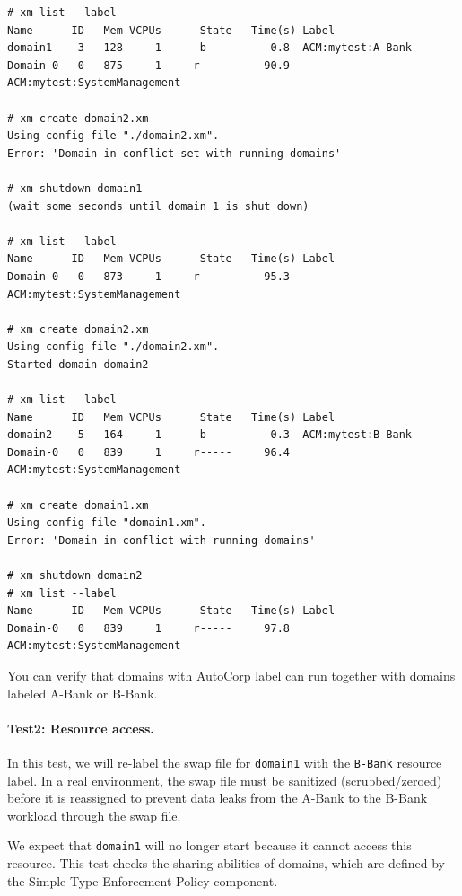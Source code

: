 \documentclass[11pt,twoside,final,openright]{report}
\begin{document}
\begin{scriptsize}
\begin{verbatim}
# xm list --label
Name      ID   Mem VCPUs      State   Time(s) Label
domain1    3   128     1     -b----      0.8  ACM:mytest:A-Bank
Domain-0   0   875     1     r-----     90.9  ACM:mytest:SystemManagement

# xm create domain2.xm
Using config file "./domain2.xm".
Error: 'Domain in conflict set with running domains'

# xm shutdown domain1
(wait some seconds until domain 1 is shut down)

# xm list --label
Name      ID   Mem VCPUs      State   Time(s) Label
Domain-0   0   873     1     r-----     95.3  ACM:mytest:SystemManagement

# xm create domain2.xm
Using config file "./domain2.xm".
Started domain domain2

# xm list --label
Name      ID   Mem VCPUs      State   Time(s) Label
domain2    5   164     1     -b----      0.3  ACM:mytest:B-Bank
Domain-0   0   839     1     r-----     96.4  ACM:mytest:SystemManagement

# xm create domain1.xm
Using config file "domain1.xm".
Error: 'Domain in conflict with running domains'

# xm shutdown domain2
# xm list --label
Name      ID   Mem VCPUs      State   Time(s) Label
Domain-0   0   839     1     r-----     97.8  ACM:mytest:SystemManagement
\end{verbatim}
\end{scriptsize}

You can verify that domains with AutoCorp label can run together with
domains labeled A-Bank or B-Bank.

\paragraph{Test2: Resource access.} In this test, we will re-label the
swap file for \verb|domain1| with the \verb|B-Bank| resource label. In a
real environment, the swap file must be sanitized (scrubbed/zeroed) before
it is reassigned to prevent data leaks from the A-Bank to the B-Bank workload
through the swap file.

We expect that \verb|domain1| will no longer start because it cannot access
this resource. This test checks the sharing abilities of domains, which are
defined by the Simple Type Enforcement Policy component.
\end{document}
